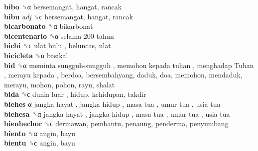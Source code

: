 \textbf{bibo} ␝α  bersemangat, hangat, rancak  \\
\textbf{bibu} \emph{adj}  ␝ϲ  bersemangat, hangat, rancak  \\
\textbf{bicarbonato} ␝α  bikarbonat  \\
\textbf{bicentenario} ␝α   selama 200 tahun   \\
\textbf{bichi} ␝ϲ   ulat bulu , beluncas, ulat  \\
\textbf{bicicleta} ␝α  basikal  \\
\textbf{bid} ␝α   meminta sungguh-sungguh ,  memohon kepada tuhan ,  menghadap Tuhan ,  merayu kepada , berdoa, bersembahyang, daduk, doa, memohon, mendaduk, merayu, mohon, pohon, rayu, shalat  \\
\textbf{bida} ␝ϲ   dunia luar , hidup, kehidupan, takdir  \\
\textbf{biehes} α   jangka hayat ,  jangka hidup ,  masa tua ,  umur tua ,  usia tua   \\
\textbf{biehesa} ␝α   jangka hayat ,  jangka hidup ,  masa tua ,  umur tua ,  usia tua   \\
\textbf{bienhechor} ␝ϲ  dermawan, pembantu, penaung, penderma, penyumbang  \\
\textbf{biento} ␝α  angin, bayu  \\
\textbf{bientu} ␝ϲ  angin, bayu  \\
